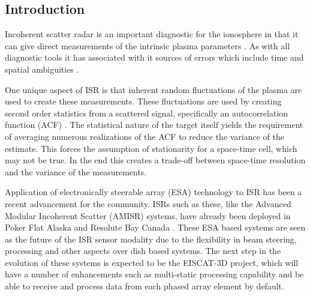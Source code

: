 \documentclass[draft,ras]{agutex}
\begin{document}
%
%

%

\begin{article}

\section{Introduction}
Incoherent scatter radar is an important diagnostic for the ionosphere in that it can give direct measurements of the intrinsic plasma parameters  \citep{dougherty:farley1960, farleydougherty:ISR2, doughteryfarley:ISR3, hagfors1961}. As with all diagnostic tools it has associated with it sources of errors which include time and spatial ambiguities \citep{farley1969, farleycomppower1969, hysell2008, RDS:RDS20236}.  

One unique aspect of ISR is that inherent random fluctuations of the plasma are used to create these measurements. These fluctuations are used by creating second order statistics from a scattered signal, specifically an autocorrelation function (ACF) \citep{farley1969}. The statistical nature of the target itself yields the requirement of averaging numerous realizations of the ACF to reduce the variance of the estimate. This forces the assumption of stationarity for a space-time cell, which may not be true. In the end this creates a trade-off between space-time resolution and the variance of the measurements.

Application of electronically steerable array (ESA) technology to ISR has been a recent advancement for the community. ISRs such as these, like the Advanced Modular Incoherent Scatter (AMISR) systems, have already been deployed in Poker Flat Alaska and Resolute Bay Canada \citep{Nicolls:2007ie, dahlgren2012di}. These ESA based systems are seen as the future of the ISR sensor modality due to the flexibility in beam steering, processing and other aspects over dish based systems. The next step in the evolution of these systems is expected to be the EISCAT-3D project, which will have a number of enhancements such as multi-static processing capability and be able to receive and process data from each phased array element by default.


\end{article}
\end{document}
